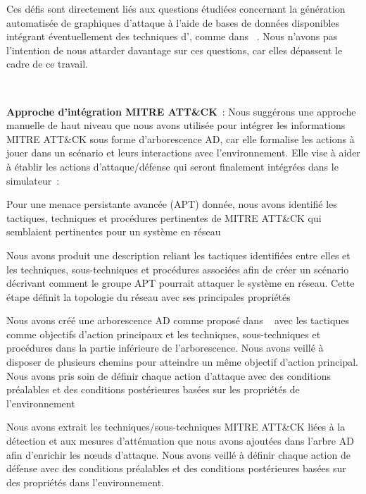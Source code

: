 Ces défis sont directement liés aux questions étudiées concernant la génération automatisée de graphiques d'attaque à l'aide de bases de données disponibles intégrant éventuellement des techniques d', comme dans ~\cite{GFalco2018}. Nous n'avons pas l'intention de nous attarder davantage sur ces questions, car elles dépassent le cadre de ce travail.

\

\noindent
\textbf{Approche d'intégration MITRE ATT\&CK}~: Nous suggérons une approche manuelle de haut niveau que nous avons utilisée pour intégrer les informations MITRE ATT\&CK sous forme d'arborescence AD, car elle formalise les actions à jouer dans un scénario et leurs interactions avec l'environnement. Elle vise à aider à établir les actions d'attaque/défense qui seront finalement intégrées dans le simulateur~:
\begin{enumerate*}[label=\arabic*),itemjoin={;\quad}]

  \item Pour une menace persistante avancée (APT) donnée, nous avons identifié les tactiques, techniques et procédures pertinentes de MITRE ATT\&CK qui semblaient pertinentes pour un système en réseau



  \item Nous avons produit une description reliant les tactiques identifiées entre elles et les techniques, sous-techniques et procédures associées afin de créer un scénario décrivant comment le groupe APT pourrait attaquer le système en réseau. Cette étape définit la topologie du réseau avec ses principales propriétés

  \item Nous avons créé une arborescence AD comme proposé dans ~\cite{BKordy2010} avec les tactiques comme objectifs d'action principaux et les techniques, sous-techniques et procédures dans la partie inférieure de l'arborescence. Nous avons veillé à disposer de plusieurs chemins pour atteindre un même objectif d'action principal. Nous avons pris soin de définir chaque action d'attaque avec des conditions préalables et des conditions postérieures basées sur les propriétés de l'environnement

  \item Nous avons extrait les techniques/sous-techniques MITRE ATT\&CK liées à la détection et aux mesures d'atténuation que nous avons ajoutées dans l'arbre AD afin d'enrichir les nœuds d'attaque. Nous avons veillé à définir chaque action de défense avec des conditions préalables et des conditions postérieures basées sur des propriétés dans l'environnement.




\end{enumerate*}
